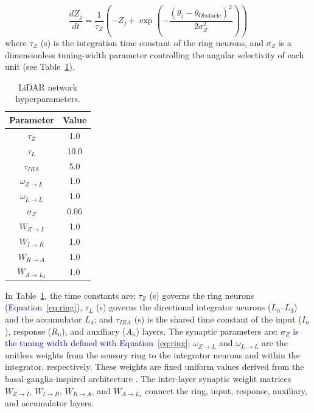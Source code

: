 \documentclass[preprint,12pt]{elsarticle}
\newcommand{\revblue}[1]{\textcolor{blue}{#1}}
\begin{document}
\begin{equation}\label{eq:ring}
\frac{d Z_j}{d t} = \frac{1}{\tau_Z} \left( -Z_j + \exp\left( -\frac{(\theta_j - \theta_{\text{Obstacle}})^2}{2\sigma_{Z}^2} \right) \right)
\end{equation}
where $\tau_Z$ (s) is the integration time constant of the ring neurons, and $\sigma_Z$ is a dimensionless tuning-width parameter controlling the angular selectivity of each unit (see Table~\ref{table:LiDAR}).

\begin{table}[t]
\centering
\caption{LiDAR network hyperparameters.}
\begin{tabular}{|c|c|}
\hline
\textbf{Parameter} & \textbf{Value} \\ \hline
$\tau_{Z}$ & 1.0 \\ \hline
$\tau_{L}$ & 10.0 \\ \hline
$\tau_{IRA}$ & 5.0 \\ \hline
$\omega_{Z\rightarrow L}$ & 1.0 \\\hline
$\omega_{L\rightarrow L}$ & 1.0 \\ \hline
$\sigma_{Z}$ & 0.06 \\ \hline
$W_{Z\rightarrow I}$ & 1.0 \\ \hline
$W_{I\rightarrow R}$ & 1.0 \\ \hline
$W_{R\rightarrow A}$ & 1.0 \\ \hline
$W_{A\rightarrow L_4}$ & 1.0 \\ \hline
\end{tabular}
\label{table:LiDAR}
\end{table}

In Table~\ref{table:LiDAR}, the time constants are: $\tau_{Z}$ (s) governs the ring neurons \revblue{(Equation~\eqref{eq:ring})}, $\tau_{L}$ (s) governs the directional integrator neurons ($L_0$--$L_3$) and the accumulator $L_4$; and $\tau_{IRA}$ (s) is the shared time constant of the input ($I_n$), response ($R_n$), and auxiliary ($A_n$) layers.
The synaptic parameters are: \revblue{$\sigma_{Z}$ is the tuning width defined with Equation~\eqref{eq:ring};} $\omega_{Z\rightarrow L}$ and $\omega_{L\rightarrow L}$ are the unitless weights from the sensory ring to the integrator neurons and within the integrator, respectively. These weights are fixed uniform values derived from the basal-ganglia-inspired architecture \citep{sarvestani2013computational}.
The inter-layer synaptic weight matrices $W_{Z\rightarrow I}$, $W_{I\rightarrow R}$, $W_{R\rightarrow A}$, and $W_{A\rightarrow L_4}$ connect the ring, input, response, auxiliary, and accumulator layers.
\end{document}
